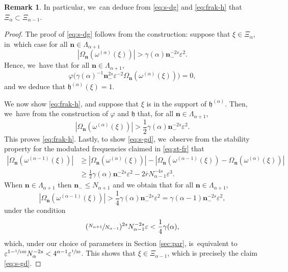 \documentclass[JEP,XML,SOM,Unicode,published]{cedram}
\theoremstyle{plain}
\theoremstyle{definition}
\newtheorem{remark}[theorem]{Remark}
\newcommand{\nb}{{\boldsymbol n}}
\newcommand{\1}{\mathbf{1}}
\let\epsilon\varepsilon
\begin{document}
\begin{remark} In particular, we~can deduce from \eqref{eq:s-dg} and \eqref{eq:frak-h} that $\Xi_{\alpha}\subset\Xi_{\alpha-1}$.
\end{remark}

\begin{proof} The proof of \eqref{eq:s-dg} follows from the construction: suppose that $\xi\in\Xi_{\alpha}$, in~which case for all $\nb\in\Lambda_{\alpha+1}$
\[
|\Omega_{\nb}(\omega^{(\alpha)}(\xi))|
>
\gamma(\alpha)\nb_{-}^{-2s}\epsilon^{2}.
\]
Hence, we~have that for all $\nb\in\Lambda_{\alpha+1}$,
\[
\varphi
\big(
\gamma(\alpha)^{-1}\nb_{-}^{2s}\epsilon^{-2}\Omega_{\nb}(\omega^{(\alpha)}(\xi))
\big) = 0,
\]
and we deduce that $\mathfrak{h}^{(\alpha)}(\xi)=1$.

We now show \eqref{eq:frak-h}, and suppose that $\xi$ is in the support of $\mathfrak{h}^{(\alpha)}$. Then, we~have from the construction of $\varphi$ and $\mathfrak{h}$ that, for all $\nb\in\Lambda_{\alpha+1}$,
\[
|\Omega_{\nb}(\omega^{(\alpha)}(\xi))|
>
\frac{1}{2} \gamma(\alpha)\nb_{-}^{-2s}\epsilon^{2}.
\]
This proves \eqref{eq:frak-h}. Lastly, to show \eqref{eq:s-gd}, we~observe from the stability property for the modulated frequencies claimed in \eqref{eq:st-fr} that
\begin{align*}
|\Omega_{\nb}(\omega^{(\alpha-1)}(\xi))|
&\geq
|\Omega_{\nb}(\omega^{(\alpha)}(\xi))|-
|\Omega_{\nb}(\omega^{(\alpha-1)}(\xi))-\Omega_{\nb}(\omega^{(\alpha)}(\xi))|
\\
&\geq \frac{1}{2}\gamma(\alpha)\nb_{-}^{-2s}\epsilon^{2} -
2\overline{r}N_{\alpha-1}^{-4s}\epsilon^{3}.
\end{align*}
When $\nb\in\Lambda_{\alpha+1}$ then $\nb_{-}\leq N_{\alpha+1}$ and we obtain that for all $\nb\in\Lambda_{\alpha+1}$,
\[
|\Omega_{\nb}(\omega^{(\alpha-1)}(\xi))| > \frac{1}{4}\gamma(\alpha)\nb_{-}^{-2s}\epsilon^{2} = \gamma(\alpha-1)\nb_{-}^{-2s}\epsilon^{2},
\]
under the condition
\[
(\sfrac{N_{\alpha+1}}{N_{\alpha-1}})^{2s}N_{\alpha-1}^{-2s}\epsilon
<\frac{1}{4}\gamma(\alpha),
\]
which, under our choice of parameters in Section \ref{sec:par}, is~equivalent to
$\epsilon^{1 - \sfrac{1}{100}}N_{\alpha}^{-2s} < 4^{\alpha-1}\epsilon^{\sfrac{1}{30}}$.
This shows that $\xi\in\Xi_{\alpha-1}$, which is precisely the claim \eqref{eq:s-gd}.
\end{proof}
\end{document}
